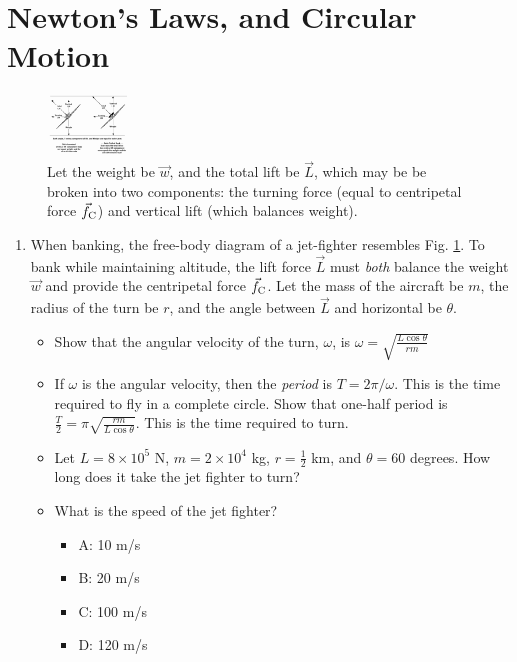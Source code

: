 \documentclass[10pt]{article}
\begin{document}
\section{Newton's Laws, and Circular Motion}
\begin{figure}[ht]
\centering
\includegraphics[width=0.2\textwidth,trim=10cm 4.84cm 0cm 0.6cm,clip=true]{bank.png}
\caption{\label{fig:bank} Let the weight be $\vec{w}$, and the total lift be $\vec{L}$, which may be be broken into two components: the turning force (equal to centripetal force $\vec{f}_{\rm C}$) and vertical lift (which balances weight).}
\end{figure}
\begin{enumerate}
\item When banking, the free-body diagram of a jet-fighter resembles Fig. \ref{fig:bank}.  To bank while maintaining altitude, the lift force $\vec{L}$ must \textit{both} balance the weight $\vec{w}$ and provide the centripetal force $\vec{f}_{\rm C}$.  Let the mass of the aircraft be $m$, the radius of the turn be $r$, and the angle between $\vec{L}$ and horizontal be $\theta$.
\begin{itemize}
\item Show that the angular velocity of the turn, $\omega$, is $\omega = \sqrt{\frac{L\cos\theta}{rm}}$ \vspace{3cm}
\item If $\omega$ is the angular velocity, then the \textit{period} is $T = 2\pi/\omega$.  This is the time required to fly in a complete circle.  Show that one-half period is $\frac{T}{2} = \pi\sqrt{\frac{r m}{L\cos\theta}}$.  This is the time required to turn.\vspace{3cm}
\item Let $L = 8\times 10^5$ N, $m = 2\times 10^4$ kg, $r = \frac{1}{2}$ km, and $\theta = 60$ degrees.  How long does it take the jet fighter to turn?\vspace{3cm}
\item What is the speed of the jet fighter?
\begin{itemize}
\item A: 10 m/s 
\item B: 20 m/s
\item C: 100 m/s
\item D: 120 m/s
\end{itemize}
\end{itemize} 
\end{enumerate}
\end{document}
